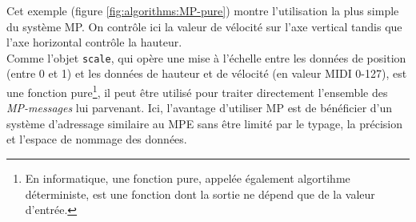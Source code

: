 \noindent Cet exemple (figure \ref{fig:algorithms:MP-pure}) montre l'utilisation la plus simple du système MP. On contrôle ici la valeur de vélocité sur l'axe vertical tandis que l'axe horizontal contrôle la hauteur.\\
\indent Comme l'objet \verb|scale|, qui opère une mise à l'échelle entre les données de position (entre 0 et 1) et les données de hauteur et de vélocité (en valeur \gls{MIDI} 0-127), est une fonction pure\footnote{En informatique, une fonction pure, appelée également algortihme déterministe, est une fonction dont la sortie ne dépend que de la valeur d'entrée.}, il peut être utilisé pour traiter directement l'ensemble des \textit{MP-messages} lui parvenant. Ici, l'avantage d'utiliser MP est de bénéficier d'un système d'adressage similaire au \gls{MPE} sans être limité par le typage, la précision et l'espace de nommage des données.

